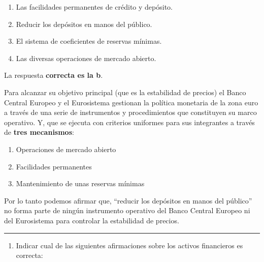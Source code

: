 \documentclass[
  letterpaper,
  DIV=11,
  numbers=noendperiod]{scrreprt}
\providecommand{\tightlist}{%
  \setlength{\itemsep}{0pt}\setlength{\parskip}{0pt}}\usepackage{longtable,booktabs,array}
\begin{document}
\begin{enumerate}
\def\labelenumi{\alph{enumi})}
\item
  Las facilidades permanentes de crédito y depósito.
\item
  Reducir los depósitos en manos del público.
\item
  El sistema de coeficientes de reservas mínimas.
\item
  Las diversas operaciones de mercado abierto.
\end{enumerate}

\begin{tcolorbox}[enhanced jigsaw, left=2mm, opacityback=0, colback=white, breakable, arc=.35mm, bottomrule=.15mm, rightrule=.15mm, toprule=.15mm, leftrule=.75mm, colframe=quarto-callout-tip-color-frame]
\begin{minipage}[t]{5.5mm}
\textcolor{quarto-callout-tip-color}{\faLightbulb}
\end{minipage}%
\begin{minipage}[t]{\textwidth - 5.5mm}

La respuesta \textbf{correcta es la b}.

Para alcanzar su objetivo principal (que es la estabilidad de precios)
el Banco Central Europeo y el Eurosistema gestionan la política
monetaria de la zona euro a través de una serie de instrumentos y
procedimientos que constituyen su marco operativo. Y, que se ejecuta con
criterios uniformes para sus integrantes a través de \textbf{tres
mecanismos}:

\begin{enumerate}
\def\labelenumi{\arabic{enumi}.}
\item
  Operaciones de mercado abierto
\item
  Facilidades permanentes
\item
  Mantenimiento de unas reservas mínimas
\end{enumerate}

Por lo tanto podemos afirmar que, ``reducir los depósitos en manos del
público'' no forma parte de ningún instrumento operativo del Banco
Central Europeo ni del Eurosistema para controlar la estabilidad de
precios.

\end{minipage}%
\end{tcolorbox}

\begin{center}\rule{0.5\linewidth}{0.5pt}\end{center}

\begin{enumerate}
\def\labelenumi{\arabic{enumi}.}
\setcounter{enumi}{11}
\tightlist
\item
  Indicar cual de las siguientes afirmaciones sobre los activos
  financieros es correcta:
\end{enumerate}
\end{document}
